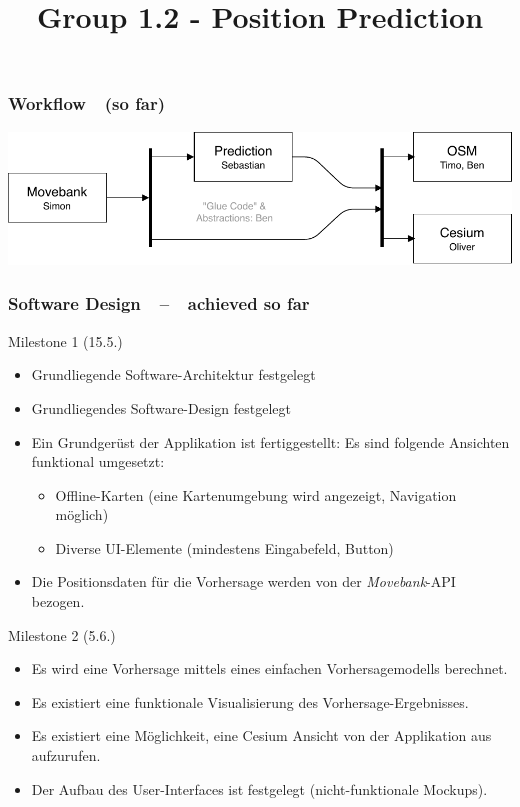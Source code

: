 \documentclass[xcolor=dvipsnames]{beamer}
\title[] {Group 1.2 - Position Prediction}
\date{} %
\begin{document}
\frame{\titlepage}

\begin{frame}
	\frametitle{\textbf{Workflow}~~(so far)}
	\includegraphics[width=\textwidth]{diagrams/Tasks.pdf}
\end{frame}

\begin{frame}
	\frametitle{\textbf{Software Design}~~--~~achieved so far}
	\large{Milestone 1 (15.5.)}
	\normalsize
	\begin{itemize} 
		\item \color{Green}Grundliegende Software-Architektur festgelegt
		\item \color{Green}Grundliegendes Software-Design festgelegt
		\item \color{Green}Ein Grundgerüst der Applikation ist fertiggestellt: Es sind folgende Ansichten funktional umgesetzt:
		\begin{itemize} 
			\item \color{Green}Offline-Karten (eine Kartenumgebung wird angezeigt, Navigation möglich)
			\item \color{Green}Diverse UI-Elemente (mindestens Eingabefeld, Button)
		\end{itemize} 
		\item \color{LightGray}Die Positionsdaten für die Vorhersage werden von der \textit{Movebank}-API bezogen.
	\end{itemize}     
	\large{Milestone 2 (5.6.)}
	\normalsize
	\begin{itemize} 
		\item \color{LightGray}Es wird eine Vorhersage mittels eines einfachen Vorhersagemodells berechnet.
		\item \color{LightGray}Es existiert eine funktionale Visualisierung des Vorhersage-Ergebnisses.
		\item \color{LightGray}Es existiert eine Möglichkeit, eine Cesium Ansicht von der Applikation aus aufzurufen.
		\item \color{Green}Der Aufbau des User-Interfaces ist festgelegt (nicht-funktionale Mockups).
	\end{itemize}
\end{frame}
\end{document}
